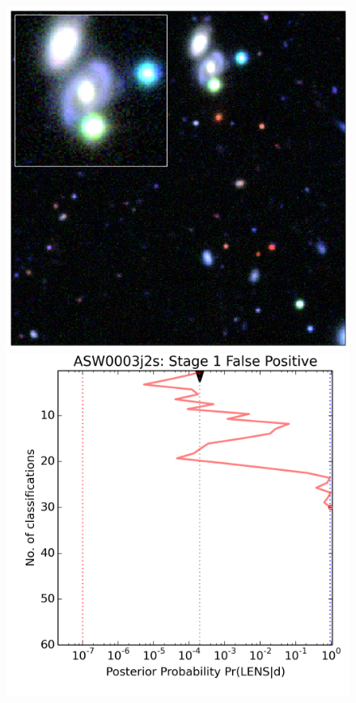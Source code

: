 \documentclass[useAMS,usenatbib,a4paper]{mn2e}
\begin{document}
\begin{figure}
\begin{minipage}{\linewidth}
\begin{minipage}[t]{0.47\linewidth}
\begin{minipage}{0.50\linewidth}
    \end{minipage}
  \end{minipage}\hfill
  \begin{minipage}[t]{0.47\linewidth}
    \begin{minipage}{0.46\linewidth}
      \centering\includegraphics[width=\linewidth]{sw-system-figs/ASW0003j2s_gri.png}
    \end{minipage}\hfill
    \begin{minipage}{0.50\linewidth}
      \centering\includegraphics[width=\linewidth]{sw-system-figs/ASW0003j2s_stage1_trajectory.png}

\end{minipage}
\end{minipage}
\end{minipage}
\end{figure}
\end{document}
